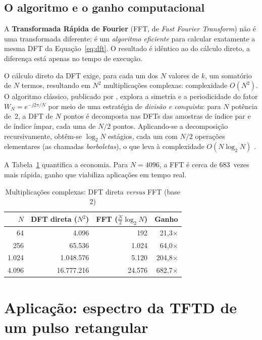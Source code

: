 \documentclass[
    12pt,
    openright,
    oneside,
    a4paper,
    chapter=TITLE,
    section=TITLE,
    brazil
]{abntex2}
\begin{document}
\section{O algoritmo e o ganho computacional}

A \textbf{Transformada Rápida de Fourier} (FFT, de \emph{Fast Fourier Transform}) não é
uma transformada diferente: é um \emph{algoritmo eficiente} para calcular exatamente a
mesma DFT da Equação~\eqref{eq:dft}. O resultado é idêntico ao do cálculo direto, a
diferença está apenas no tempo de execução.

O cálculo direto da DFT exige, para cada um dos $N$ valores de $k$, um somatório de $N$
termos, resultando em $N^2$ multiplicações complexas: complexidade $O(N^2)$. O algoritmo
clássico, publicado por , explora a simetria e a periodicidade do
fator $W_N = e^{-j2\pi/N}$ por meio de uma estratégia de \emph{divisão e conquista}:
para $N$ potência de~2, a DFT de $N$ pontos é decomposta nas DFTs das amostras de
índice par e de índice ímpar, cada uma de $N/2$ pontos. Aplicando-se a decomposição
recursivamente, obtêm-se $\log_2 N$ estágios, cada um com $N/2$ operações elementares
(as chamadas \emph{borboletas}), o que leva à complexidade $O(N\log_2 N)$
\cite{oppenheim2013}.

A Tabela~\ref{tab:fft} quantifica a economia. Para $N = 4096$, a FFT é cerca de
683~vezes mais rápida, ganho que viabiliza aplicações em tempo real.

\begin{table}[H]
\centering
\caption{Multiplicações complexas: DFT direta \emph{versus} FFT (base 2)}
\label{tab:fft}
\begin{tabular}{@{}rrrr@{}}
\toprule
$N$ & DFT direta ($N^2$) & FFT ($\tfrac{N}{2}\log_2 N$) & Ganho \\
\midrule
    64 &        4.096 &    192 &  21,3$\times$ \\
   256 &       65.536 &  1.024 &  64,0$\times$ \\
 1.024 &    1.048.576 &  5.120 & 204,8$\times$ \\
 4.096 &   16.777.216 & 24.576 & 682,7$\times$ \\
\bottomrule
\end{tabular}
\end{table}

\chapter{Aplicação: espectro da TFTD de um pulso retangular}
\label{cap:aplicacao}
\end{document}
